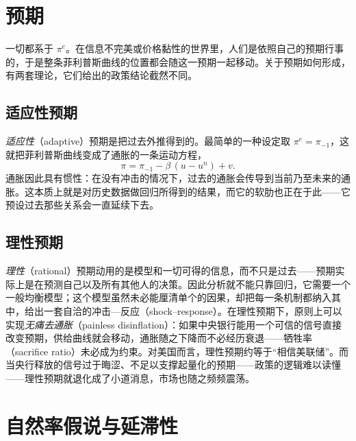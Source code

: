 \section{预期}

一切都系于 $\pi^{e}$。在信息不完美或价格黏性的世界里，人们是依照自己的预期行事的，于是整条菲利普斯曲线的位置都会随这一预期一起移动。关于预期如何形成，有两套理论，它们给出的政策结论截然不同。

\subsection{适应性预期}

\emph{适应性}（adaptive）预期是把过去外推得到的。最简单的一种设定取 $\pi^{e}=\pi_{-1}$，这就把菲利普斯曲线变成了通胀的一条运动方程，
\[
\pi = \pi_{-1} - \beta\,(u-u^{n}) + v.
\]
通胀因此具有惯性：在没有冲击的情况下，过去的通胀会传导到当前乃至未来的通胀。这本质上就是对历史数据做回归所得到的结果，而它的软肋也正在于此——它预设过去那些关系会一直延续下去。


\subsection{理性预期}

\emph{理性}（rational）预期动用的是模型和一切可得的信息，而不只是过去——预期实际上是在预测自己以及所有其他人的决策。因此分析就不能只靠回归，它需要一个一般均衡模型；这个模型虽然未必能厘清单个的因果，却把每一条机制都纳入其中，给出一套自洽的冲击—反应（shock--response）。在理性预期下，原则上可以实现\emph{无痛去通胀}（painless disinflation）：如果中央银行能用一个可信的信号直接改变预期，供给曲线就会移动，通胀随之下降而不必经历衰退——牺牲率（sacrifice ratio）未必成为约束。对美国而言，理性预期约等于``相信美联储''。而当央行释放的信号过于晦涩、不足以支撑起量化的预期——政策的逻辑难以读懂——理性预期就退化成了小道消息，市场也随之频频震荡。

\section{自然率假说与延滞性}

